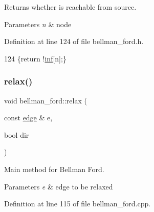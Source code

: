 Returns whether is reachable from source. 


\begin{DoxyParams}{Parameters}
{\em n} & node \\
\hline
\end{DoxyParams}


Definition at line 124 of file bellman\+\_\+ford.\+h.


\begin{DoxyCode}
124 \{\textcolor{keywordflow}{return} !\mbox{\hyperlink{classbellman__ford_a5c69a3ac59077a7a7e4b0484e5f85a32}{inf}}[n];\}
\end{DoxyCode}
\mbox{\label{classbellman__ford_a7beb9204dc5bc65ed880a044a5aad81b}} 
\subsubsection{\texorpdfstring{relax()}{relax()}}
{\footnotesize\ttfamily void bellman\+\_\+ford\+::relax (\begin{DoxyParamCaption}\item[{const \mbox{\hyperlink{classedge}{edge}} \&}]{e,  }\item[{bool}]{dir }\end{DoxyParamCaption})\hspace{0.3cm}{\ttfamily [private]}}



Main method for Bellman Ford. 


\begin{DoxyParams}{Parameters}
{\em e} & edge to be relaxed \\
\hline
\end{DoxyParams}


Definition at line 115 of file bellman\+\_\+ford.\+cpp.


